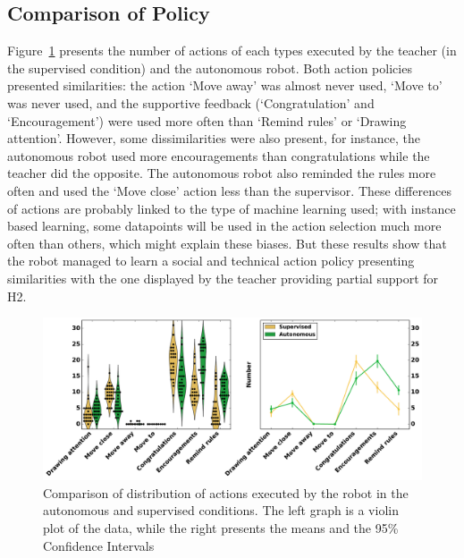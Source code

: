 
\subsection{Comparison of Policy}

Figure~\ref{fig:tutoring_actions_distribution} presents the number of actions of each types executed by the teacher (in the supervised condition) and the autonomous robot. Both action policies presented similarities: the action `Move away' was almost never used, `Move to' was never used, and the supportive feedback (`Congratulation' and `Encouragement') were used more often than `Remind rules' or `Drawing attention'. However, some dissimilarities were also present, for instance, the autonomous robot used more encouragements than congratulations while the teacher did the opposite. The autonomous robot also reminded the rules more often and used the `Move close' action less than the supervisor. These differences of actions are probably linked to the type of machine learning used; with instance based learning, some datapoints will be used in the action selection much more often than others, which might explain these biases. But these results show that the robot managed to learn a social and technical action policy presenting similarities with the one displayed by the teacher providing partial support for H2.

\begin{figure}[ht]
	\includegraphics[width=1\linewidth]{actions.pdf}
	\centering
	\caption{Comparison of distribution of actions executed by the robot in the autonomous and supervised conditions. The left graph is a violin plot of the data, while the right presents the means and the 95\% Confidence Intervals}
	\label{fig:tutoring_actions_distribution}
\end{figure}


